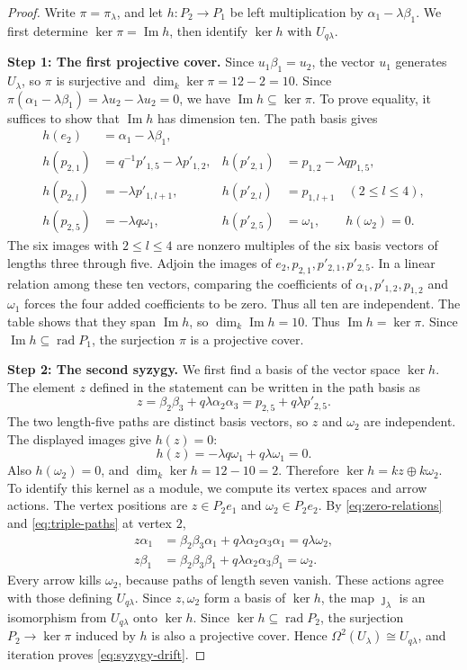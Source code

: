 \documentclass[a4paper,reqno,10pt]{amsart}
\theoremstyle{definition}
\numberwithin{equation}{section}
\newcommand{\kfield}{k}
\newcommand{\rad}{\operatorname{rad}}
\newcommand{\im}{\operatorname{Im}}
\begin{document}
\begin{proof}
Write $\pi=\pi_\lambda$, and let $h:P_2\to P_1$ be left
multiplication by $\alpha_1-\lambda\beta_1$. We first determine
$\ker\pi=\im h$, then identify $\ker h$ with $U_{q\lambda}$.

\medskip
\noindent\textbf{Step 1: The first projective cover.}
Since $u_1\beta_1=u_2$, the vector $u_1$ generates $U_\lambda$, so
$\pi$ is surjective and $\dim_\kfield\ker\pi=12-2=10$. Since
$\pi(\alpha_1-\lambda\beta_1)=\lambda u_2-\lambda u_2=0$,
we have $\im h\subseteq\ker\pi$. To prove equality, it suffices to
show that $\im h$ has dimension ten. The path basis gives
\begin{align*}
 h(e_2)&=\alpha_1-\lambda\beta_1,\\
 h(p_{2,1})&=q^{-1}p'_{1,5}-\lambda p'_{1,2},&
 h(p'_{2,1})&=p_{1,2}-\lambda q p_{1,5},\\
 h(p_{2,l})&=-\lambda p'_{1,l+1},&
 h(p'_{2,l})&=p_{1,l+1}\quad(2\leq l\leq4),\\
 h(p_{2,5})&=-\lambda q\omega_1,&
 h(p'_{2,5})&=\omega_1,\qquad h(\omega_2)=0.
\end{align*}
The six images with $2\leq l\leq4$ are nonzero multiples of the six
basis vectors of lengths three through five. Adjoin the images of
$e_2,p_{2,1},p'_{2,1},p'_{2,5}$. In a linear relation among these ten
vectors, comparing the coefficients of $\alpha_1,p'_{1,2},p_{1,2}$ and
$\omega_1$ forces the four added coefficients to be zero. Thus all ten
are independent. The table shows that they span $\im h$, so
$\dim_\kfield\im h=10$.
Thus $\im h=\ker\pi$. Since $\im h\subseteq\rad P_1$, the
surjection $\pi$ is a projective cover.

\medskip
\noindent\textbf{Step 2: The second syzygy.}
We first find a basis of the vector space $\ker h$. The element $z$ defined
in the statement can be written in the path basis as
\[
 z=\beta_2\beta_3+q\lambda\alpha_2\alpha_3
   =p_{2,5}+q\lambda p'_{2,5}.
\]
The two length-five paths are distinct basis vectors, so $z$ and
$\omega_2$ are independent. The displayed images give $h(z)=0$:
\[
 h(z)=-\lambda q\omega_1+q\lambda\omega_1=0.
\]
Also $h(\omega_2)=0$, and
$\dim_\kfield\ker h=12-10=2$. Therefore
$\ker h=\kfield z\oplus\kfield\omega_2$.
To identify this kernel as a module, we compute its vertex spaces and
arrow actions. The vertex positions are $z\in P_2e_1$ and
$\omega_2\in P_2e_2$.
By \eqref{eq:zero-relations} and \eqref{eq:triple-paths} at vertex $2$,
\begin{align*}
 z\alpha_1
 &=\beta_2\beta_3\alpha_1+q\lambda\alpha_2\alpha_3\alpha_1
 =q\lambda\omega_2,\\
 z\beta_1
 &=\beta_2\beta_3\beta_1+q\lambda\alpha_2\alpha_3\beta_1
 =\omega_2.
\end{align*}
Every arrow kills $\omega_2$, because paths of length seven vanish.
These actions agree with those defining $U_{q\lambda}$. Since $z,\omega_2$
form a basis of $\ker h$, the map $\jmath_\lambda$ is an isomorphism
from $U_{q\lambda}$ onto $\ker h$. Since $\ker h\subseteq\rad P_2$,
the surjection $P_2\to\ker\pi$ induced by $h$ is also a projective
cover. Hence $\Omega^2(U_\lambda)\cong U_{q\lambda}$, and iteration proves
\eqref{eq:syzygy-drift}.
\end{proof}
\end{document}
